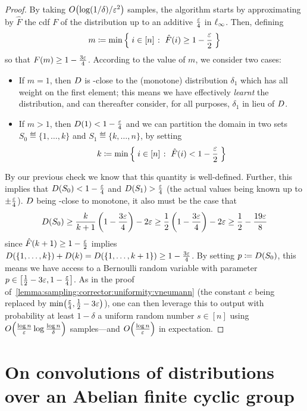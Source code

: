 \begin{proof}
By taking $\bigO{\log(1/\delta)/\eps^2}$ samples, the algorithm starts by approximating by $\hat{F}$ the cdf $F$ of the distribution up to an additive $\frac{\eps}{4}$ in $\lp[\infty]$. Then, defining
\[
    m \eqdef \min \setOfSuchThat{i \in [n]}{ \hat{F}(i) \geq 1-\frac{\eps}{2}}
\]
so that $F(m) \geq 1-\frac{3\eps}{4}$. According to the value of $m$, we consider two cases:
\begin{itemize}
  \item If $m = 1$, then $\D$ is \eps-close to the (monotone) distribution $\delta_1$ which has all weight on the first element; this means we have effectively \emph{learnt} the distribution, and can thereafter consider, for all purposes, $\delta_1$ in lieu of $\D$.  \item If $m > 1$, then $\D(1) < 1-\frac{\eps}{4}$ and we can partition the domain in two sets $S_0\eqdef\{1,\dots, k\}$ and $S_1\eqdef\{k,\dots, n\}$, by setting
\[
    k \eqdef \min \setOfSuchThat{i \in [n]}{ \hat{F}(i) < 1-\frac{\eps}{2}}
\]
\end{itemize}

By our previous check we know that this quantity is well-defined. Further, this implies that $D(S_0) < 1-\frac{\eps}{4}$ and $\D(S_1) >\frac{\eps}{4}$  (the actual values being known up to $\pm \frac{\eps}{4}$). $\D$ being \eps-close to monotone, it also must be the case that
\[
  \D(S_0) \geq \frac{k}{k+1}\left(1-\frac{3\eps}{4}\right) - 2\eps \geq \frac{1}{2}\left(1-\frac{3\eps}{4}\right) - 2\eps \geq \frac{1}{2}-\frac{19\eps}{8}
\]
since $\hat{F}(k+1) \geq 1-\frac{\eps}{2}$ implies $\D(\{1,\dots,k\})+\D(k)=\D(\{1,\dots,k+1\}) \geq 1-\frac{3\eps}{4}$. By setting $p\eqdef \D(S_0)$, this means we have access to a Bernoulli random variable with parameter $p\in\left[\frac{1}{2}-3\eps,1-\frac{\eps}{4}\right]$. As in the proof of~\cref{lemma:sampling:corrector:uniformity:vneumann} (the constant $c$ being replaced by $\min\!\left(\frac{\eps}{4}, \frac{1}{2}-3\eps\right)$), one can then leverage this to output with probability at least $1-\delta$ a uniform random number $s\in[n]$ using $\bigO{\frac{\log n}{\eps} \log\frac{\log n}{\delta}}$ samples---and $\bigO{\frac{\log n}{\eps}}$ in expectation.
\end{proof}

\clearpage
\appendix
\section{On convolutions of distributions over an Abelian finite cyclic group}\label{appendix:convolution:abelian}

